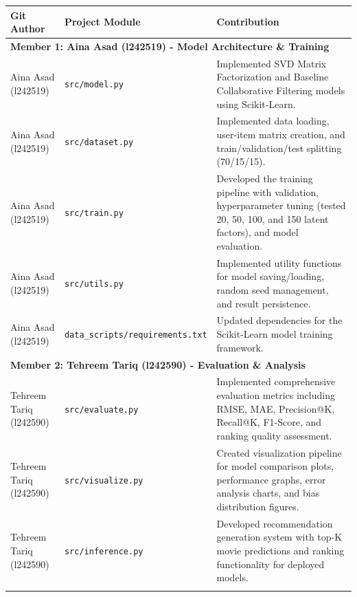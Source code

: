 \documentclass[11pt,a4paper]{article}
\renewcommand{\arraystretch}{1.25}
\begin{document}
\begin{table}[H]
\centering
\small
\renewcommand{\arraystretch}{1.25}
\begin{tabularx}{\textwidth}{p{3.2cm}p{4.0cm}>{\raggedright\arraybackslash}X}
\toprule
\textbf{Git Author} &
\textbf{Project Module} &
\textbf{Contribution} \\
\midrule
\multicolumn{3}{l}{\textbf{Member 1: Aina Asad (l242519) - Model Architecture \& Training}} \\
\midrule
Aina Asad (l242519) &
\texttt{src/model.py} &
Implemented SVD Matrix Factorization and Baseline Collaborative Filtering models using Scikit-Learn. \\
\addlinespace

Aina Asad (l242519) &
\texttt{src/dataset.py} &
Implemented data loading, user-item matrix creation, and train/validation/test splitting (70/15/15). \\
\addlinespace

Aina Asad (l242519) &
\texttt{src/train.py} &
Developed the training pipeline with validation, hyperparameter tuning (tested 20, 50, 100, and 150 latent factors), and model evaluation. \\
\addlinespace

Aina Asad (l242519) &
\texttt{src/utils.py} &
Implemented utility functions for model saving/loading, random seed management, and result persistence. \\
\addlinespace

Aina Asad (l242519) &
\texttt{data\_scripts/requirements.txt} &
Updated dependencies for the Scikit-Learn model training framework. \\
\midrule
\multicolumn{3}{l}{\textbf{Member 2: Tehreem Tariq (l242590) - Evaluation \& Analysis}} \\
\midrule
Tehreem Tariq (l242590) &
\texttt{src/evaluate.py} &
Implemented comprehensive evaluation metrics including RMSE, MAE, Precision@K, Recall@K, F1-Score, and ranking quality assessment. \\
\addlinespace

Tehreem Tariq (l242590) &
\texttt{src/visualize.py} &
Created visualization pipeline for model comparison plots, performance graphs, error analysis charts, and bias distribution figures. \\
\addlinespace

Tehreem Tariq (l242590) &
\texttt{src/inference.py} &
Developed recommendation generation system with top-K movie predictions and ranking functionality for deployed models. \\
\addlinespace


\end{tabularx}
\end{table}
\end{document}
